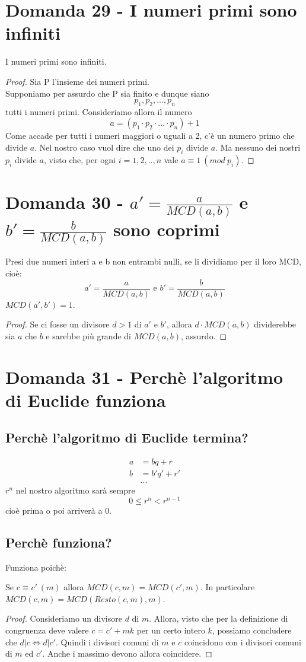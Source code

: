 \documentclass[]{article}
\begin{document}
\section{Domanda 29 - I numeri primi sono infiniti}
\begin{lem}
I numeri primi sono infiniti.
\end{lem}
\begin{proof}
Sia P l'insieme dei numeri primi.\\
Supponiamo per assurdo che P sia finito e dunque siano $$p_1, p_2, ..., p_n$$ tutti i numeri primi. Consideriamo allora il numero $$a = (p_1 \cdot p_2 \cdot ... \cdot p_n) + 1$$ Come accade per tutti i numeri maggiori o uguali a 2, c'è un numero primo che divide $a$. Nel nostro caso vuol dire che uno dei $p_i$ divide $a$. Ma nessuno dei nostri $p_i$ divide $a$, visto che, per ogni $i=1,2,..,n$ vale $a\equiv 1\ (mod\ p_i)$.
\end{proof}
\section{Domanda 30 - $a' = \frac{a}{MCD(a,b)}$ e $b' = \frac{b}{MCD(a,b)}$ sono coprimi}
\begin{lem}
Presi due numeri interi a e b non entrambi nulli, se li dividiamo per il loro MCD, cioè: 
$$a' = \frac{a}{MCD(a,b)} \text{ e } b' = \frac{b}{MCD(a,b)}$$  $MCD(a',b')=1$.
\end{lem}
\begin{proof}
Se ci fosse un divisore $d>1$ di $a'$ e $b'$, allora $d\cdot MCD(a,b)$ dividerebbe sia $a$ che $b$ e sarebbe più grande di $MCD(a,b)$, assurdo.
\end{proof} 
\section{Domanda 31 - Perchè l'algoritmo di Euclide funziona}
\subsection*{Perchè l'algoritmo di Euclide termina?}
\begin{align*}
a &= bq+r \\ b &= b'q'+r'\\&...
\end{align*}
$r^{n}$ nel nostro algoritmo sarà sempre $$0\le r^{n} < r^{n-1}$$ cioè prima o poi arriverà a $0$.
\subsection*{Perchè funziona?}
Funziona poichè: \begin{lem}
Se $c \equiv c'\ (m)$ allora $MCD(c,m) = MCD(c',m)$. In particolare $MCD(c,m) = MCD(Resto(c,m),m)$.
\end{lem}
\begin{proof}
Consideriamo un divisore $d$ di $m$. Allora, visto che per la definizione di congruenza deve valere $c=c'+mk$ per un certo intero $k$, possiamo concludere che $d|c \Leftrightarrow d | c'$. Quindi i divisori comuni di $m$ e $c$ coincidono con i divisori comuni di $m$ ed $c'$. Anche i massimo devono allora coincidere.
\end{proof}
\end{document}
